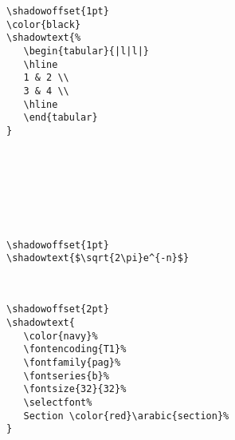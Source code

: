 \documentclass{article}
\begin{document}
\color{black}




\begin{minipage}{\textwidth}
\begin{multicols*}{2} 
{\footnotesize
\begin{verbatim}
\shadowoffset{1pt}
\color{black}
\shadowtext{%
   \begin{tabular}{|l|l|}
   \hline
   1 & 2 \\
   3 & 4 \\
   \hline
   \end{tabular}
}
\end{verbatim}}

\shadowoffset{1pt}
\phantom{}\\
\phantom{}\\
\phantom{}\\
\phantom{}\\
\phantom{}\\
\phantom{}
\end{multicols*}
\end{minipage}





\begin{minipage}{\textwidth}
\begin{multicols*}{2} 
{\footnotesize
\begin{verbatim}
\shadowoffset{1pt}
\shadowtext{$\sqrt{2\pi}e^{-n}$}
\end{verbatim}}

\shadowoffset{1pt}
\\
\phantom{}
\end{multicols*}
\end{minipage}

\color{black}

\begin{minipage}{\textwidth}
\begin{multicols*}{2} 
{\footnotesize
\begin{verbatim}
\shadowoffset{2pt}
\shadowtext{
   \color{navy}%
   \fontencoding{T1}%
   \fontfamily{pag}%
   \fontseries{b}%
   \fontsize{32}{32}%
   \selectfont%
   Section \color{red}\arabic{section}%
}
\end{verbatim}}

\shadowoffset{2pt}
\phantom{}\\
\phantom{}\\
\phantom{}\\
\phantom{}\\
\phantom{}\\
\end{multicols*}
\end{minipage}
\end{document}
